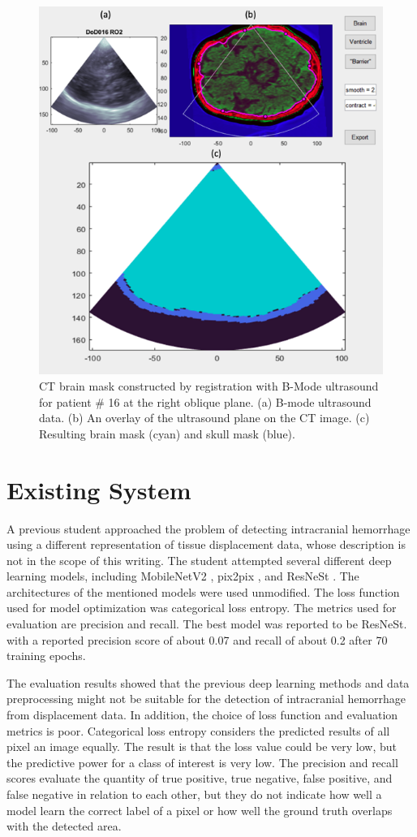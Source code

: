 \documentclass [11pt, proquest] {uwthesis}[2020/02/24]
\begin{document}
\begin{figure}
  \centering
  \includegraphics[width=0.6\linewidth]{figures/registration_output.png}
  \caption{CT brain mask constructed by registration with B-Mode ultrasound for patient \# 16 at the right oblique plane. 
  (a) B-mode ultrasound data. (b) An overlay of the ultrasound plane on the CT image. 
  (c) Resulting brain mask (cyan) and skull mask (blue).}
  \label{registration_output}
\end{figure}


\section{Existing System}

A previous student approached the problem of detecting intracranial hemorrhage using a different representation of 
tissue displacement data, whose description is not in the scope of this writing. The student attempted several different 
deep learning models, including MobileNetV2 \cite{sandler_mobilenetv2_2019}, pix2pix \cite{isola_image_image_2018}, 
and ResNeSt \cite{zhang_resnest_2020}. The architectures of the mentioned models were used unmodified. The loss function used for model 
optimization was categorical loss entropy. The metrics used for evaluation are precision and recall. The best model 
was reported to be ResNeSt. with a reported precision score of about 0.07 and recall of about 0.2 after 70 training epochs.

The evaluation results showed that the previous deep learning methods and data preprocessing might not be suitable for the 
detection of intracranial hemorrhage from displacement data. In addition, the choice of loss function and evaluation metrics 
is poor. Categorical loss entropy considers the predicted results of all pixel an image equally. The result is that the loss 
value could be very low, but the predictive power for a class of interest is very low. The precision and recall scores evaluate 
the quantity of true positive, true negative, false positive, and false negative in relation to each other, but they do not 
indicate how well a model learn the correct label of a pixel or how well the ground truth overlaps with the detected area.
\end{document}
